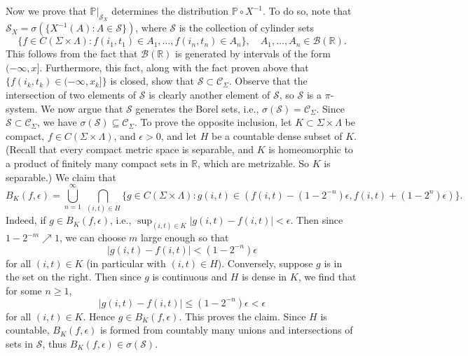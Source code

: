 \documentclass[12pt]{article}
\begin{document}
		Now we prove that $\mathbb{P}|_{\mathcal{S}_X}$ determines the distribution $\mathbb{P}\circ X^{-1}$. To do so, note that $\mathcal{S}_X = \sigma(\{X^{-1}(A) : A\in\mathcal{S}\})$, where $\mathcal{S}$ is the collection of cylinder sets
		\[
		\{f\in C(\Sigma\times\Lambda) : f(i_1,t_1)\in A_1, \dots, f(i_n,t_n) \in A_n\}, \quad A_1,\dots,A_n\in\mathcal{B}(\mathbb{R}). 
		\]
		This follows from the fact that $\mathcal{B}(\mathbb{R})$ is generated by intervals of the form $(-\infty,x]$. Furthermore, this fact, along with the fact proven above that $\{f(i_k,t_k)\in (-\infty,x_k]\}$ is closed, show that $\mathcal{S}\subset\mathcal{C}_\Sigma$. Observe that the intersection of two elements of $\mathcal{S}$ is clearly another element of $\mathcal{S}$, so $\mathcal{S}$ is a $\pi$-system. We now argue that $\mathcal{S}$ generates the Borel sets, i.e., $\sigma(\mathcal{S}) = \mathcal{C}_\Sigma$. Since $\mathcal{S}\subset \mathcal{C}_\Sigma$, we have $\sigma(\mathcal{S})\subseteq \mathcal{C}_\Sigma$. To prove the opposite inclusion, let $K\subset\Sigma\times\Lambda$ be compact, $f\in C(\Sigma\times\Lambda)$, and $\epsilon>0$, and let $H$ be a countable dense subset of $K$. (Recall that every compact metric space is separable, and $K$ is homeomorphic to a product of finitely many compact sets in $\mathbb{R}$, which are metrizable. So $K$ is separable.) We claim that
		\[
		B_K(f,\epsilon) = \bigcup_{n=1}^\infty\,\bigcap_{(i,t)\in H} \{g\in C(\Sigma\times\Lambda) : g(i,t) \in  (f(i,t)-(1-2^{-n})\epsilon, f(i,t) + (1-2^{n})\epsilon)\}.
		\]
		Indeed, if $g\in B_K(f,\epsilon)$, i.e., $\sup_{(i,t)\in K} |g(i,t)-f(i,t)| < \epsilon$. Then since $1-2^{-m}\nearrow 1$, we can choose $m$ large enough so that 
		\[
		|g(i,t)-f(i,t)| < (1-2^{-n})\epsilon
		\] 
		for all $(i,t)\in K$ (in particular with $(i,t)\in H$). Conversely, suppose $g$ is in the set on the right. Then since $g$ is continuous and $H$ is dense in $K$, we find that for some $n\geq 1$,
		\[
		|g(i,t)-f(i,t)| \leq (1-2^{-n})\epsilon < \epsilon
		\]
		for all $(i,t)\in K$. Hence $g\in B_K(f,\epsilon)$. This proves the claim. Since $H$ is countable, $B_K(f,\epsilon)$ is formed from countably many unions and intersections of sets in $\mathcal{S}$, thus $B_K(f,\epsilon)\in\sigma(\mathcal{S})$.
		
\end{document}
